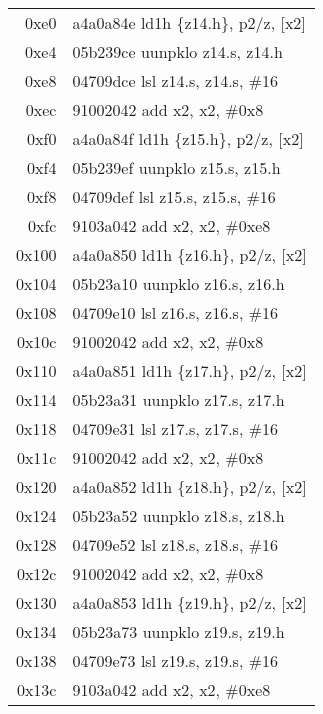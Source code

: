 \documentclass[11pt,a4paper]{article}
\begin{document}
\begin{longtable}{|r|l|}
\rowcolor{matrixload} 0xe0 & a4a0a84e \quad ld1h \{z14.h\}, p2/z, [x2] \\
\rowcolor{conversion} 0xe4 & 05b239ce \quad uunpklo z14.s, z14.h \\
\rowcolor{conversion} 0xe8 & 04709dce \quad lsl z14.s, z14.s, \#16 \\
\rowcolor{address} 0xec & 91002042 \quad add x2, x2, \#0x8 \\
\rowcolor{matrixload} 0xf0 & a4a0a84f \quad ld1h \{z15.h\}, p2/z, [x2] \\
\rowcolor{conversion} 0xf4 & 05b239ef \quad uunpklo z15.s, z15.h \\
\rowcolor{conversion} 0xf8 & 04709def \quad lsl z15.s, z15.s, \#16 \\
\rowcolor{address} 0xfc & 9103a042 \quad add x2, x2, \#0xe8 \\
\rowcolor{matrixload} 0x100 & a4a0a850 \quad ld1h \{z16.h\}, p2/z, [x2] \\
\rowcolor{conversion} 0x104 & 05b23a10 \quad uunpklo z16.s, z16.h \\
\rowcolor{conversion} 0x108 & 04709e10 \quad lsl z16.s, z16.s, \#16 \\
\rowcolor{address} 0x10c & 91002042 \quad add x2, x2, \#0x8 \\
\rowcolor{matrixload} 0x110 & a4a0a851 \quad ld1h \{z17.h\}, p2/z, [x2] \\
\rowcolor{conversion} 0x114 & 05b23a31 \quad uunpklo z17.s, z17.h \\
\rowcolor{conversion} 0x118 & 04709e31 \quad lsl z17.s, z17.s, \#16 \\
\rowcolor{address} 0x11c & 91002042 \quad add x2, x2, \#0x8 \\
\rowcolor{matrixload} 0x120 & a4a0a852 \quad ld1h \{z18.h\}, p2/z, [x2] \\
\rowcolor{conversion} 0x124 & 05b23a52 \quad uunpklo z18.s, z18.h \\
\rowcolor{conversion} 0x128 & 04709e52 \quad lsl z18.s, z18.s, \#16 \\
\rowcolor{address} 0x12c & 91002042 \quad add x2, x2, \#0x8 \\
\rowcolor{matrixload} 0x130 & a4a0a853 \quad ld1h \{z19.h\}, p2/z, [x2] \\
\rowcolor{conversion} 0x134 & 05b23a73 \quad uunpklo z19.s, z19.h \\
\rowcolor{conversion} 0x138 & 04709e73 \quad lsl z19.s, z19.s, \#16 \\
\rowcolor{address} 0x13c & 9103a042 \quad add x2, x2, \#0xe8 \\

\end{longtable}
\end{document}
